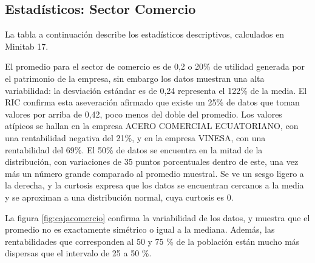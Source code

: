 \documentclass[12pt,a4paper,twoside]{article}
\begin{document}
\subsection{Estadísticos: Sector Comercio}
La tabla a continuación describe los estadísticos descriptivos, calculados en Minitab 17.
\begin{figure}[H]
\end{figure}
El promedio para el sector de comercio es de 0,2 o 20\% de utilidad generada por el patrimonio de la empresa, sin embargo los datos muestran una alta variabilidad: la desviación estándar es de 0,24 representa el 122\% de la media. El RIC confirma esta aseveración afirmado que existe un 25\% de datos que toman valores por arriba de 0,42, poco menos del doble del promedio. Los valores atípicos  se hallan en la empresa ACERO COMERCIAL ECUATORIANO,  con una rentabilidad negativa del 21\%, y en la empresa VINESA, con una rentabilidad del 69\%.  El 50\% de datos se encuentra en la mitad de la distribución, con variaciones de 35 puntos porcentuales dentro de este, una vez más un número grande comparado al promedio muestral. Se ve un sesgo ligero a la derecha, y la curtosis expresa que los datos se encuentran cercanos a la media y se aproximan a una distribución normal, cuya curtosis es 0. 
\begin{figure}[H]
\end{figure}
La figura \ref{fig:cajacomercio} confirma la variabilidad de los datos, y muestra que el promedio no es exactamente simétrico o igual a la mediana. Además, las rentabilidades que corresponden al 50 y 75 \% de la población están mucho más dispersas que el intervalo de 25 a 50 \%.
\end{document}

